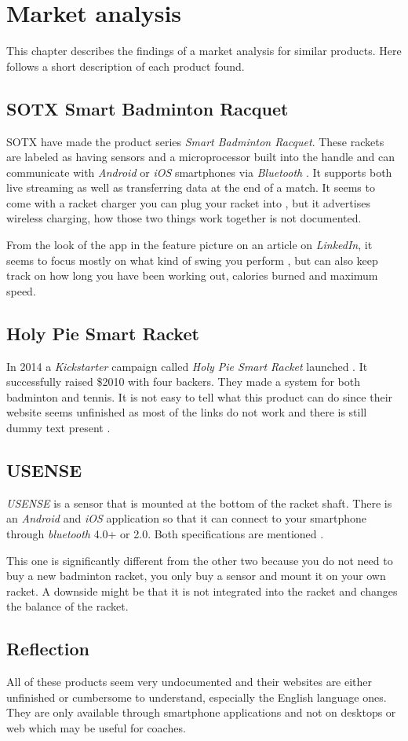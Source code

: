 \chapter{Market analysis}
This chapter describes the findings of a market analysis for similar products. 
Here follows a short description of each product found.

\section*{SOTX Smart Badminton Racquet}
SOTX have made the product series \textit{Smart Badminton Racquet}. 
These rackets are labeled as having sensors and a microprocessor built into the handle and can communicate with \textit{Android} or \textit{iOS} smartphones via \textit{Bluetooth}  \citep{marketAnalysis:sotxsite}. 
It supports both live streaming as well as transferring data at the end of a match. 
It seems to come with a racket charger you can plug your racket into \citep{marketAnalysis:sotxhw}, but it advertises wireless charging, how those two things work together is not documented.

From the look of the app in the feature picture on an article on \textit{LinkedIn}, it seems to focus mostly on what kind of swing you perform \citep{marketAnalysis:sotxapp}, but can also keep track on how long you have been working out, calories burned and maximum speed.

\section*{Holy Pie Smart Racket}
In 2014 a \textit{Kickstarter} campaign called \textit{Holy Pie Smart Racket} launched \citep{marketAnalysis:holypie}. 
It successfully raised \$2010 with four backers. 
They made a system for both badminton and tennis. 
It is not easy to tell what this product can do since their website seems unfinished as most of the links do not work and there is still dummy text present \citep{marketAnalysis:holypi}.

\section*{USENSE}
\textit{USENSE} is a sensor that is mounted at the bottom of the racket shaft. 
There is an \textit{Android} and \textit{iOS} application so that it can connect to your smartphone through \textit{\gls{bluetooth}} 4.0+ or 2.0. 
Both specifications are mentioned \citep{marketAnalysis:usense}.
 
This one is significantly different from the other two because you do not need to buy a new badminton racket, you only buy a sensor and mount it on your own racket. 
A downside might be that it is not integrated into the racket and changes the balance of the racket.

\section*{Reflection}
All of these products seem very undocumented and their websites are either unfinished or cumbersome to understand, especially the English language ones. 
They are only available through smartphone applications and not on desktops or web which may be useful for coaches.
